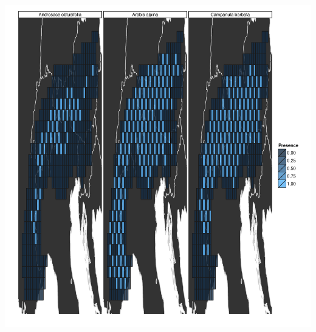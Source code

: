 \documentclass[11pt,]{article}
\let\origfigure\figure
\let\endorigfigure\endfigure
\renewenvironment{figure}[1][2] {
	\expandafter\origfigure\expandafter[H]
} {
	\endorigfigure
}
\begin{document}
\begin{figure}
\includegraphics[width=7.5in,height=8.5in]{article_files/figure-latex/unnamed-chunk-6-1} \caption{Species distributions. Squares represent planning units. For a given species, planning units that were found to be inhabited are denoted with bright blue.}\label{fig:unnamed-chunk-6}
\end{figure}
\end{document}
